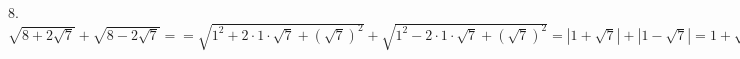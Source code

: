 8. $\sqrt{8+2\sqrt{7}}+\sqrt{8-2\sqrt{7}}==\sqrt{1^2+2\cdot1\cdot\sqrt{7}+(\sqrt{7})^2}+\sqrt{1^2-2\cdot1\cdot\sqrt{7}+(\sqrt{7})^2}=
|1+\sqrt{7}|+|1-\sqrt{7}|=1+\sqrt{7}+\sqrt{7}-1=2\sqrt{7}.$\\
